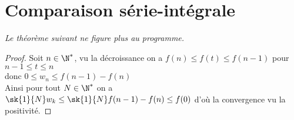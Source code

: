 	\section{Comparaison série-intégrale}
		${}$\\
		\textit{\footnotesize Le théorème suivant ne figure plus au programme.}
		\\ 
		\begin{proof}
		Soit $n\in\N^*$, vu la décroissance on a $f(n)\leq f(t) \leq f(n-1) $ pour $n-1\leq t\leq n$ \\donc $0\leq w_n \leq f(n-1)-f(n)$ \\
		Ainsi pour tout $N\in\N^*$ on a $\sk{1}{N} w_k \leq \sk{1}{N} f(n-1)-f(n) \leq f(0)$ d'où la convergence vu la positivité. 
		\end{proof}
		${}$ \\ 
